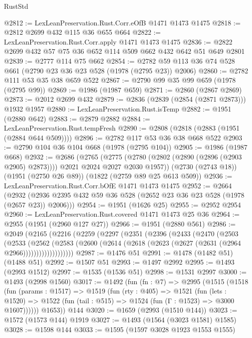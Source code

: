 \begin{lexlean}{RustStd}
\begin{coremodule}
@2812 := LexLeanPreservation.Rust.Corr.eOfB @1471 @1473 @1475
@2818 := @2812 @2699 @432 @115 @36 @655 @664
@2822 := LexLeanPreservation.Rust.Corr.apply @1471 @1473 @1475
@2836 := @2822 @2699 @432 @57 @75 @36 @652 @114 @509 @662 @432 @642 @51 @649 @2801
@2839 := @2777 @114 @75 @662
@2854 := @2782 @59 @113 @36 @74 @528 @661 (@2790 @23 @36 @23 @528 (@1978 (@2795 @23)) @2006)
@2860 := @2782 @111 @53 @35 @38 @659 @522
@2867 := @2790 @99 @35 @99 @659 (@1978 (@2795 @99))
@2869 := @1986 (@1987 @659)
@2871 := @2860 (@2867 @2869)
@2873 := @2012 @2699 @432
@2879 := @2836 (@2839 (@2854 (@2871 @2873))) @1932 @1957
@2880 := LexLeanPreservation.Rust.isTemp
@2882 := @1951 (@2880 @642)
@2883 := @2879 @2882
@2884 := LexLeanPreservation.Rust.tempFresh
@2890 := @2808 (@2818 (@2883 (@1951 (@2884 @644 @509))))
@2896 := @2782 @117 @53 @36 @38 @668 @522
@2903 := @2790 @104 @36 @104 @668 (@1978 (@2795 @104))
@2905 := @1986 (@1987 @668)
@2932 := @2686
    (@2765
      (@2775 (@2780 (@2802 (@2890 (@2896 (@2903 @2905) @2873)))) @2021 @2024 @2027 @2030 @1957))
    (@2730 (@2743 @18))
    (@1951 (@2750 @26 @89))
    (@1822 (@2759 @89 @25 @613 @509))
@2936 := LexLeanPreservation.Rust.Corr.bOfE @1471 @1473 @1475
@2952 := @2664
    (@2932 (@2936 @2395 @432 @59 @36 @528 (@2652 @23 @36 @23 @528 (@1978 (@2657 @23)) @2006)))
@2954 := @1951 (@1626 @25)
@2955 := @2952 @2954
@2960 := LexLeanPreservation.Rust.covered @1471 @1473 @25 @36
@2964 := @2955 (@1951 (@2960 @127 @27))
@2966 := @1951 (@2880 @561)
@2986 := @2049
    (@2165
      (@2216
        (@2259
          (@2297
            (@2351
              (@2396
                (@2433
                  (@2470
                    (@2503
                      (@2533
                        (@2562
                          (@2583
                            (@2600
                              (@2614 (@2618 (@2623 (@2627 (@2631 (@2964 @2966)))))))))))))))))))
@2987 := @1476 @51
@2991 := @1478 (@1482 @51) (@1488 @51)
@2992 := @1507 @51
@2993 := @1497 @2992
@2995 := @1493 (@2993 @1512)
@2997 := @1535 (@1536 @51)
@2998 := @1531 @2997
@3000 := @1493 (@2998 @1560)
@3017 := @1492
    (fun (fn : @7) =>
    @2995
      (@1515
        (@1518
          (fun (params : @1517) =>
          @1519
            (fun (rty : @405) =>
            @1521
              (fun (lets : @1520) =>
              @1522 (fun (tail : @515) => @1524 (fun (Γ : @1523) => @3000 @1607))))))
        @1653))
    @144
@3020 := @1659 (@2993 (@1510 @144))
@3023 := @1572 (@1573 @144) @1919
@3027 := @1493 (@1564 (@3023 @1581) @1585)
@3028 := @1598 @144
@3033 := @1595 (@1597 @3028 @1923 @1553 @1555)

\end{coremodule}
\end{lexlean}
